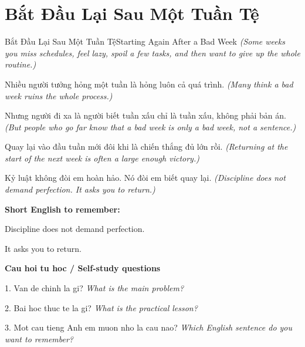 \section{Bắt Đầu Lại Sau Một Tuần Tệ}
\begin{truyen}{Bắt Đầu Lại Sau Một Tuần Tệ}{Starting Again After a Bad Week}
\textit{(Some weeks you miss schedules, feel lazy, spoil a few tasks, and then want to give up the whole routine.)}

Nhiều người tưởng hỏng một tuần là hỏng luôn cả quá trình.
\textit{(Many think a bad week ruins the whole process.)}

Nhưng người đi xa là người biết tuần xấu chỉ là tuần xấu, không phải bản án.
\textit{(But people who go far know that a bad week is only a bad week, not a sentence.)}

Quay lại vào đầu tuần mới đôi khi là chiến thắng đủ lớn rồi.
\textit{(Returning at the start of the next week is often a large enough victory.)}

\end{truyen}

\begin{baihoc}
Kỷ luật không đòi em hoàn hảo. Nó đòi em biết quay lại.
\textit{(Discipline does not demand perfection. It asks you to return.)}
\end{baihoc}

\begin{ghinhoanh}
\textbf{Short English to remember:}

Discipline does not demand perfection.

It asks you to return.

\end{ghinhoanh}

\begin{tuhocnhanh}
\textbf{Cau hoi tu hoc / Self-study questions}

1. Van de chinh la gi? \textit{What is the main problem?}

2. Bai hoc thuc te la gi? \textit{What is the practical lesson?}

3. Mot cau tieng Anh em muon nho la cau nao? \textit{Which English sentence do you want to remember?}
\end{tuhocnhanh}
